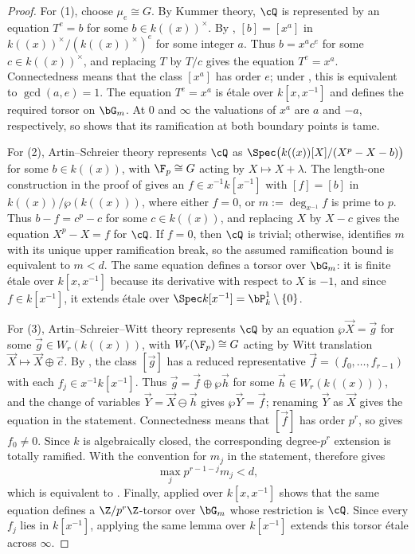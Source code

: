 \begin{proof}
For (1), choose $\mu_e\cong G$. By Kummer theory, $\cQ$ is represented by
an equation $T^e=b$ for some $b\in k((x))^\times$. By
, $[b]=[x^a]$ in
$k((x))^\times/(k((x))^\times)^e$ for some integer $a$. Thus
$b=x^ac^e$ for some $c\in k((x))^\times$, and replacing $T$ by $T/c$
gives the equation $T^e=x^a$. Connectedness means that the class $[x^a]$
has order $e$; under , this is equivalent
to $\gcd(a,e)=1$.
The equation $T^e=x^a$ is \'etale over $k[x,x^{-1}]$
and defines the required torsor on $\bG_m$. At $0$ and $\infty$ the
valuations of $x^a$ are $a$ and $-a$, respectively, so
 shows that its ramification at both
boundary points is tame.

For (2), Artin--Schreier theory represents $\cQ$ as
$\Spec\bigl(k((x))[X]/(X^p-X-b)\bigr)$ for some $b\in k((x))$, with
$\F_p\cong G$ acting by $X\mapsto X+\lambda$. The length-one construction
in the proof of  gives an
$f\in x^{-1}k[x^{-1}]$ with $[f]=[b]$ in $k((x))/\wp(k((x)))$, where
either $f=0$, or $m:=\deg_{x^{-1}}f$ is prime to $p$. Thus
$b-f=c^p-c$ for some $c\in k((x))$, and replacing $X$ by $X-c$ gives the
equation $X^p-X=f$ for $\cQ$. If $f=0$, then $\cQ$ is trivial; otherwise,
 identifies $m$ with its unique
upper ramification break, so the assumed ramification bound is equivalent
to $m<d$. The same equation defines a torsor over $\bG_m$: it is finite
\'etale over $k[x,x^{-1}]$ because its derivative with respect to $X$ is
$-1$, and since $f\in k[x^{-1}]$, it extends \'etale over
$\Spec k[x^{-1}]=\bP^1_k\setminus\{0\}$.

For (3), Artin--Schreier--Witt theory represents $\cQ$ by an equation
$\wp\vec X=\vec g$ for some $\vec g\in W_r(k((x)))$, with
$W_r(\F_p)\cong G$ acting by Witt translation
$\vec X\mapsto\vec X\oplus\vec c$. By
, the class $[\vec g]$ has a
reduced representative $\vec f=(f_0,\dots,f_{r-1})$ with each
$f_j\in x^{-1}k[x^{-1}]$. Thus
$\vec g=\vec f\oplus\wp\vec h$ for some $\vec h\in W_r(k((x)))$, and the
change of variables $\vec Y=\vec X\ominus\vec h$ gives
$\wp\vec Y=\vec f$; renaming $\vec Y$ as $\vec X$ gives the equation in the
statement. Connectedness means that $[\vec f]$ has order $p^r$, so
 gives $f_0\neq0$. Since $k$
is algebraically closed, the corresponding degree-$p^r$ extension is totally
ramified. With the convention for $m_j$ in the statement,
 therefore gives
\[
\max_j p^{r-1-j}m_j<d,
\]
which is equivalent to . Finally,
 applied over $k[x,x^{-1}]$ shows that the same
equation defines a $\Z/p^r\Z$-torsor over $\bG_m$ whose restriction is
$\cQ$. Since every $f_j$ lies in $k[x^{-1}]$, applying the same lemma over
$k[x^{-1}]$ extends this torsor \'etale across $\infty$.
\end{proof}

